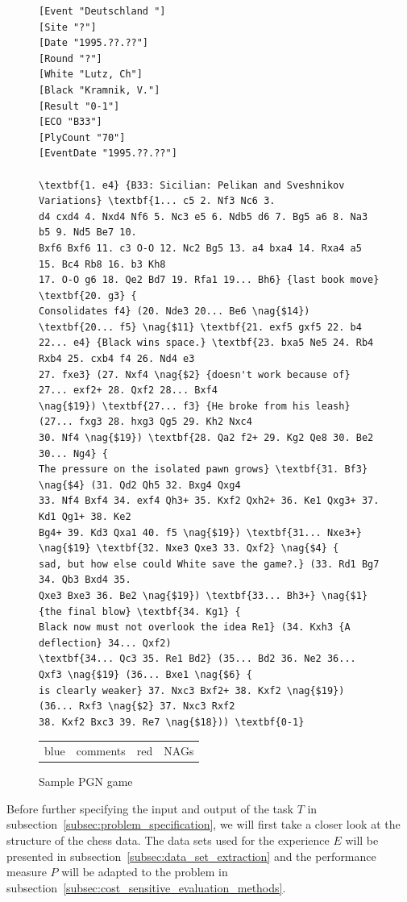 \documentclass[article,type=msc,colorback,accentcolor=tud7b]{tudthesis}
\begin{document}
	\begin{figure}[H]
	  \centering
	  \begin{lstlisting}	  
[Event "Deutschland "]
[Site "?"]
[Date "1995.??.??"]
[Round "?"]
[White "Lutz, Ch"]
[Black "Kramnik, V."]
[Result "0-1"]
[ECO "B33"]
[PlyCount "70"]
[EventDate "1995.??.??"]

\textbf{1. e4} {B33: Sicilian: Pelikan and Sveshnikov Variations} \textbf{1... c5 2. Nf3 Nc6 3.
d4 cxd4 4. Nxd4 Nf6 5. Nc3 e5 6. Ndb5 d6 7. Bg5 a6 8. Na3 b5 9. Nd5 Be7 10.
Bxf6 Bxf6 11. c3 O-O 12. Nc2 Bg5 13. a4 bxa4 14. Rxa4 a5 15. Bc4 Rb8 16. b3 Kh8
17. O-O g6 18. Qe2 Bd7 19. Rfa1 19... Bh6} {last book move} \textbf{20. g3} {
Consolidates f4} (20. Nde3 20... Be6 \nag{$14}) \textbf{20... f5} \nag{$11} \textbf{21. exf5 gxf5 22. b4
22... e4} {Black wins space.} \textbf{23. bxa5 Ne5 24. Rb4 Rxb4 25. cxb4 f4 26. Nd4 e3
27. fxe3} (27. Nxf4 \nag{$2} {doesn't work because of} 27... exf2+ 28. Qxf2 28... Bxf4
\nag{$19}) \textbf{27... f3} {He broke from his leash} (27... fxg3 28. hxg3 Qg5 29. Kh2 Nxc4
30. Nf4 \nag{$19}) \textbf{28. Qa2 f2+ 29. Kg2 Qe8 30. Be2 30... Ng4} {
The pressure on the isolated pawn grows} \textbf{31. Bf3} \nag{$4} (31. Qd2 Qh5 32. Bxg4 Qxg4
33. Nf4 Bxf4 34. exf4 Qh3+ 35. Kxf2 Qxh2+ 36. Ke1 Qxg3+ 37. Kd1 Qg1+ 38. Ke2
Bg4+ 39. Kd3 Qxa1 40. f5 \nag{$19}) \textbf{31... Nxe3+} \nag{$19} \textbf{32. Nxe3 Qxe3 33. Qxf2} \nag{$4} {
sad, but how else could White save the game?.} (33. Rd1 Bg7 34. Qb3 Bxd4 35.
Qxe3 Bxe3 36. Be2 \nag{$19}) \textbf{33... Bh3+} \nag{$1} {the final blow} \textbf{34. Kg1} {
Black now must not overlook the idea Re1} (34. Kxh3 {A deflection} 34... Qxf2)
\textbf{34... Qc3 35. Re1 Bd2} (35... Bd2 36. Ne2 36... Qxf3 \nag{$19} (36... Bxe1 \nag{$6} {
is clearly weaker} 37. Nxc3 Bxf2+ 38. Kxf2 \nag{$19}) (36... Rxf3 \nag{$2} 37. Nxc3 Rxf2
38. Kxf2 Bxc3 39. Re7 \nag{$18})) \textbf{0-1}
	  \end{lstlisting}	  

      \caption{Sample PGN game}
      \begin{tabular}{r@{: }l r@{: }l}
        blue & comments & red & NAGs
      \end{tabular}
      \label{fig:sample_pgn_game}
	\end{figure}
	
    Before further specifying the input and output of the task $T$ in subsection~\ref{subsec:problem_specification}, we will first take a closer look at the structure of the chess data. The data sets used for the experience $E$ will be presented in subsection~\ref{subsec:data_set_extraction} and the performance measure $P$ will be adapted to the problem in subsection~\ref{subsec:cost_sensitive_evaluation_methods}.
    
\end{document}
